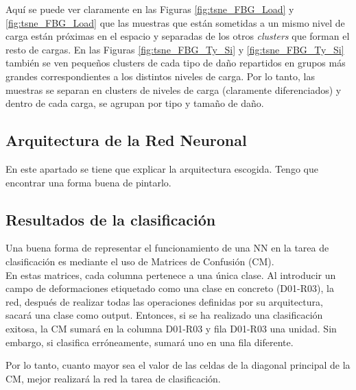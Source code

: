 Aquí se puede ver claramente en las Figuras \ref{fig:tsne_FBG_Load} y \ref{fig:tsne_FBG_Load} que las muestras que están sometidas a un mismo nivel de carga están próximas en el espacio y separadas de los otros \textit{clusters} que forman el resto de cargas. En las Figuras \ref{fig:tsne_FBG_Ty_Si} y \ref{fig:tsne_FBG_Ty_Si} también se ven pequeños clusters de cada tipo de daño repartidos en grupos más grandes correspondientes a los distintos niveles de carga. Por lo tanto, las muestras se separan en clusters de niveles de carga (claramente diferenciados) y dentro de cada carga, se agrupan por tipo y tamaño de daño.


\clearpage




\subsection{Arquitectura de la Red Neuronal}

En este apartado se tiene que explicar la arquitectura escogida. Tengo que encontrar una forma buena de pintarlo.




\subsection{Resultados de la clasificación}

Una buena forma de representar el funcionamiento de una NN en la tarea de clasificación es mediante el uso de Matrices de Confusión (CM).\\

En estas matrices, cada columna pertenece a una única clase. Al introducir un campo de deformaciones etiquetado como una clase en concreto (D01-R03), la red, después de realizar todas las operaciones definidas por su arquitectura, sacará una clase como output. Entonces, si se ha realizado una clasificación exitosa, la CM sumará en la columna D01-R03 y fila D01-R03 una unidad. Sin embargo, si clasifica erróneamente, sumará uno en una fila diferente. 

Por lo tanto, cuanto mayor sea el valor de las celdas de la diagonal principal de la CM, mejor realizará la red la tarea de clasificación.

